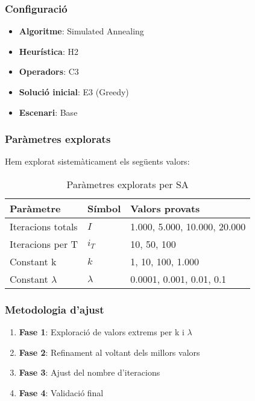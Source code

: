 \subsubsection{Configuració}
\begin{itemize}
    \item \textbf{Algoritme}: Simulated Annealing
    \item \textbf{Heurística}: H2
    \item \textbf{Operadors}: C3
    \item \textbf{Solució inicial}: E3 (Greedy)
    \item \textbf{Escenari}: Base
\end{itemize}

\subsubsection{Paràmetres explorats}

Hem explorat sistemàticament els següents valors:

\begin{table}[H]
\centering
\begin{tabular}{@{}lll@{}}
\toprule
\textbf{Paràmetre} & \textbf{Símbol} & \textbf{Valors provats} \\
\midrule
Iteracions totals & $I$ & 1.000, 5.000, 10.000, 20.000 \\
Iteracions per T & $i_T$ & 10, 50, 100 \\
Constant k & $k$ & 1, 10, 100, 1.000 \\
Constant $\lambda$ & $\lambda$ & 0.0001, 0.001, 0.01, 0.1 \\
\bottomrule
\end{tabular}
\caption{Paràmetres explorats per SA}
\label{tab:exp3-params}
\end{table}

\subsubsection{Metodologia d'ajust}

\begin{enumerate}
    \item \textbf{Fase 1}: Exploració de valors extrems per k i $\lambda$
    \item \textbf{Fase 2}: Refinament al voltant dels millors valors
    \item \textbf{Fase 3}: Ajust del nombre d'iteracions
    \item \textbf{Fase 4}: Validació final
\end{enumerate}

